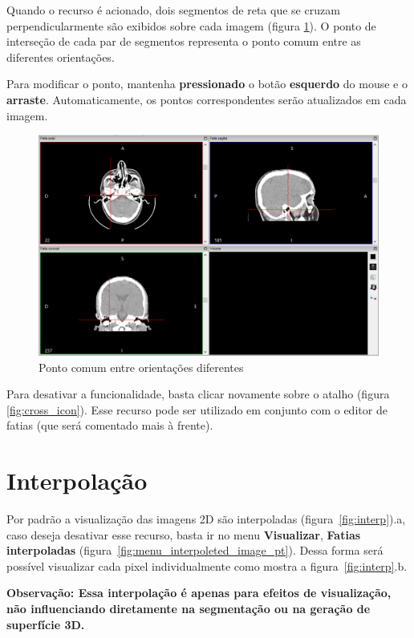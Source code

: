 Quando o recurso é acionado, dois segmentos de reta que se cruzam perpendicularmente são exibidos
sobre cada imagem (figura \ref{fig:cross_all}). O ponto de interseção de cada par de segmentos
representa o ponto comum  entre as diferentes orientações.

\newpage

Para modificar o ponto, mantenha \textbf{pressionado} o botão \textbf{esquerdo} do mouse e o
\textbf{arraste}. Automaticamente, os pontos correspondentes serão atualizados em cada imagem.

\begin{figure}[!htb]
\centering
\includegraphics[scale=0.4]{../user_guide_figures/invesalius_screen/multiplanar_window_cross_pt.png}
\caption{Ponto comum entre orientações diferentes}
\label{fig:cross_all}
\end{figure}

Para desativar a funcionalidade, basta clicar novamente sobre o atalho (figura \ref{fig:cross_icon}).
Esse recurso pode ser utilizado em conjunto com o editor de fatias (que será comentado mais à frente).


\section{Interpolação}

Por padrão a visualização das imagens 2D são interpoladas (figura~\ref{fig:interp}).a, caso deseja desativar esse recurso, basta ir no menu \textbf{Visualizar}, \textbf{Fatias interpoladas} (figura~\ref{fig:menu_interpoleted_image_pt}). Dessa forma será possível visualizar cada pixel individualmente como mostra a figura~\ref{fig:interp}.b. 

\textbf{Observação: Essa interpolação é apenas para efeitos de visualização, não influenciando diretamente na segmentação ou na geração de superfície 3D.}

